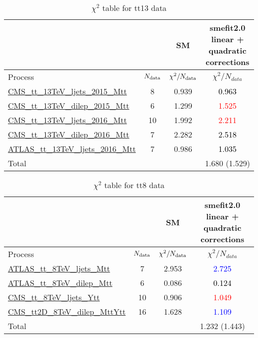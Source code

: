 \documentclass{article}
\begin{document}
\begin{table}[H]
\centering
\begin{tabular}{|l|c|c|c|}
\hline
 \multicolumn{2}{|c|}{} & SM& smefit2.0 linear + quadratic corrections\\ \hline
Process & $N_{\rm data}$ & $\chi^ 2/N_{\rm data}$& $\chi^ 2/N_{data}$\\ \hline
\href{https://arxiv.org/abs/1610.04191}{CMS_tt_13TeV_ljets_2015_Mtt} & 8 & 0.939 & \textcolor{black}                            {0.963} \\ \hline
\href{https://arxiv.org/abs/1708.07638}{CMS_tt_13TeV_dilep_2015_Mtt} & 6 & 1.299 & \textcolor{red}                            {1.525} \\ \hline
\href{https://arxiv.org/abs/1803.08856}{CMS_tt_13TeV_ljets_2016_Mtt} & 10 & 1.992 & \textcolor{red}                            {2.211} \\ \hline
\href{https://arxiv.org/abs/1811.06625}{CMS_tt_13TeV_dilep_2016_Mtt} & 7 & 2.282 & \textcolor{black}                            {2.518} \\ \hline
\href{https://arxiv.org/abs/1908.07305}{ATLAS_tt_13TeV_ljets_2016_Mtt} & 7 & 0.986 & \textcolor{black}                            {1.035} \\ \hline
\hline Total & &  & 1.680 (1.529) \\ \hline
\end{tabular}
\caption{$\chi^2$ table for tt13 data}
\end{table}
\begin{table}[H]
\centering
\begin{tabular}{|l|c|c|c|}
\hline
 \multicolumn{2}{|c|}{} & SM& smefit2.0 linear + quadratic corrections\\ \hline
Process & $N_{\rm data}$ & $\chi^ 2/N_{\rm data}$& $\chi^ 2/N_{data}$\\ \hline
\href{https://arxiv.org/abs/1511.04716}{ATLAS_tt_8TeV_ljets_Mtt} & 7 & 2.953 & \textcolor{blue}                            {2.725} \\ \hline
\href{https://arxiv.org/abs/1607.07281}{ATLAS_tt_8TeV_dilep_Mtt} & 6 & 0.086 & \textcolor{black}                            {0.124} \\ \hline
\href{https://arxiv.org/abs/1505.04480}{CMS_tt_8TeV_ljets_Ytt} & 10 & 0.906 & \textcolor{red}                            {1.049} \\ \hline
\href{https://arxiv.org/abs/1703.01630}{CMS_tt2D_8TeV_dilep_MttYtt} & 16 & 1.628 & \textcolor{blue}                            {1.109} \\ \hline
\hline Total & &  & 1.232 (1.443) \\ \hline
\end{tabular}
\caption{$\chi^2$ table for tt8 data}
\end{table}
\end{document}
